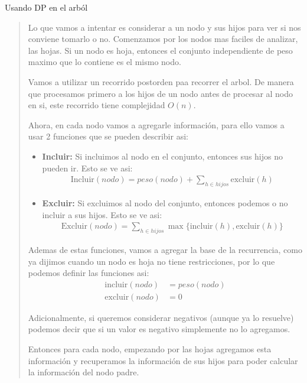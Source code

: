 \textcolor{bibi}{Usando DP en el arból}
\begin{quote}
    Lo que vamos a intentar es considerar a un nodo y sus hijos para ver si nos conviene tomarlo o no. Comenzamos por los nodos mas faciles de analizar, las hojas. Si un nodo es hoja, entonces el conjunto independiente de peso maximo que lo contiene es el mismo nodo. \vspace{.2cm}

    Vamos a utilizar un recorrido postorden paa recorrer el arbol. De manera que procesamos primero a los hijos de un nodo antes de procesar al nodo en si, este recorrido tiene complejidad $O(n)$.\vspace{.2cm}

    Ahora, en cada nodo vamos a agregarle información, para ello vamos a usar 2 funciones que se pueden describir asi: \vspace{.2cm}
    \begin{itemize}
        \item \textbf{Incluir:} Si incluimos al nodo en el conjunto, entonces sus hijos no pueden ir. Esto se ve asi:
        \begin{align*}
            \text{Incluir}(nodo) = peso(nodo) +\sum_{h \in hijos} \text{excluir}(h)
        \end{align*}
        \item \textbf{Excluir:} Si excluimos al nodo del conjunto, entonces podemos o no incluir a sus hijos. Esto se ve asi: 
        \begin{align*}
            \text{Excluir}(nodo) = \sum_{h \in hijos} \max\{\text{incluir}(h), \text{excluir}(h)\}
        \end{align*}
    \end{itemize}

    Ademas de estas funciones, vamos a agregar la base de la recurrencia, como ya dijimos cuando un nodo es hoja no tiene restricciones, por lo que podemos definir las funciones asi: \vspace{.2cm}
    \begin{align*}
        \text{incluir}(nodo) &= peso(nodo) \\
        \text{excluir}(nodo) &= 0
    \end{align*}

    Adicionalmente, si queremos considerar negativos (aunque ya lo resuelve) podemos decir que si un valor es negativo simplemente no lo agregamos. \vspace{.2cm}

    Entonces para cada nodo, empezando por las hojas agregamos esta información y recuperamos la información de sus hijos para poder calcular la información del nodo padre. \vspace{.2cm}


\end{quote}

